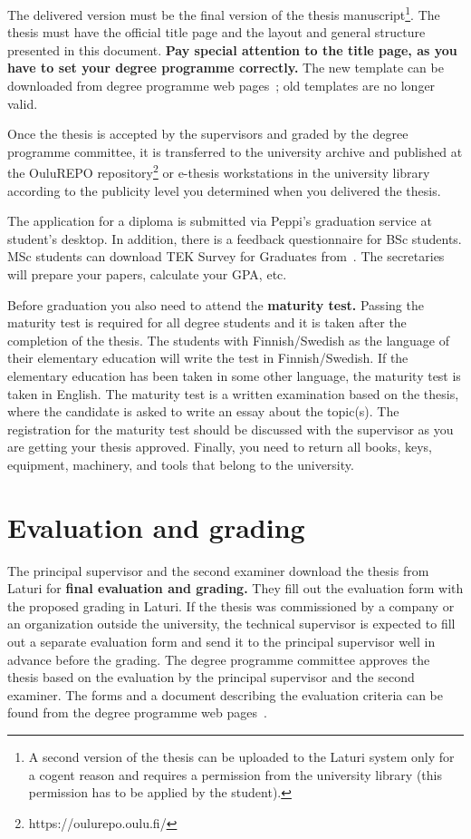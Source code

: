 The delivered version must be the final version of the thesis manuscript\footnote{A second version of the thesis can be uploaded to the Laturi system only for a cogent reason and requires a permission from the university library (this permission has to be applied by the student).}. The thesis must have the official title page and the layout and general structure presented in this document. \textbf{Pay special attention to the title page, as you have to set your degree programme correctly.} The new template can be downloaded from degree programme web pages~\cite{mscstudies}; old templates are no longer valid.

Once the thesis is accepted by the supervisors and graded by the degree programme committee, it is transferred to the university archive and published at the OuluREPO repository\footnote{https://oulurepo.oulu.fi/} or e-thesis workstations in the university library according to the publicity level you determined when you delivered the thesis.

The application for a diploma is submitted via Peppi's graduation service at student's desktop. In addition, there is a feedback questionnaire for BSc students. MSc students can download TEK Survey for Graduates from~\cite{mscgraduation}. The secretaries will prepare your papers, calculate your GPA, etc. 

Before graduation you also need to attend the \textbf{maturity test.} Passing the maturity test is required for all degree students and it is taken after the completion of the thesis. The students with Finnish/Swedish as the language of their elementary education will write the test in Finnish/Swedish. If the elementary education has been taken in some other language, the maturity test is taken in English. The maturity test is a written examination based on the thesis, where the candidate is asked to write an essay about the topic(s). The registration for the maturity test should be discussed with the supervisor as you are getting your thesis approved. Finally, you need to return all books, keys, equipment, machinery, and tools that belong to the university.

\section{Evaluation and grading}

The principal supervisor and the second examiner download the thesis from Laturi for \textbf{final evaluation and grading.} They fill out the evaluation form with the proposed grading in Laturi. If the thesis was commissioned by a company or an organization outside the university, the technical supervisor is expected to fill out a separate evaluation form and send it to the principal supervisor well in advance before the grading. The degree programme committee approves the thesis based on the evaluation by the principal supervisor and the second examiner. The forms and a document describing the evaluation criteria can be found from the degree programme web pages~\cite{mscstudies}.

